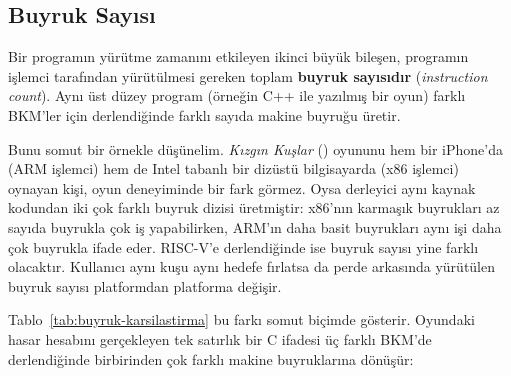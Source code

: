 \subsection{Buyruk Sayısı}
\label{subsec:buyruk-sayisi}

Bir programın yürütme zamanını etkileyen ikinci büyük bileşen, programın işlemci tarafından yürütülmesi gereken toplam \textbf{buyruk sayısıdır} (\emph{instruction count}). Aynı üst düzey program (örneğin C++ ile yazılmış bir oyun) farklı BKM'ler için derlendiğinde farklı sayıda makine buyruğu üretir.

Bunu somut bir örnekle düşünelim. \emph{Kızgın Kuşlar} (\kizginkus) oyununu hem bir iPhone'da (ARM işlemci) hem de Intel tabanlı bir dizüstü bilgisayarda (x86 işlemci) oynayan kişi, oyun deneyiminde bir fark görmez. Oysa derleyici aynı kaynak kodundan iki çok farklı buyruk dizisi üretmiştir: x86'nın karmaşık buyrukları az sayıda buyrukla çok iş yapabilirken, ARM'ın daha basit buyrukları aynı işi daha çok buyrukla ifade eder. RISC-V\@'e derlendiğinde ise buyruk sayısı yine farklı olacaktır. Kullanıcı aynı kuşu aynı hedefe fırlatsa da perde arkasında yürütülen buyruk sayısı platformdan platforma değişir.

Tablo~\ref{tab:buyruk-karsilastirma} bu farkı somut biçimde gösterir. Oyundaki hasar hesabını gerçekleyen tek satırlık bir C ifadesi üç farklı BKM'de derlendiğinde birbirinden çok farklı makine buyruklarına dönüşür:

